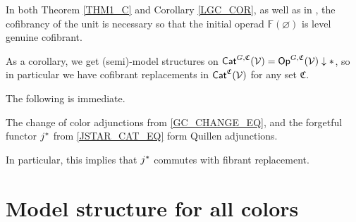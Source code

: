 \documentclass[a4paper,10pt
,draft
]{article}%
\renewcommand{\1}{\eta}%
\begin{document}
In both Theorem \ref{THM1_C} and Corollary \ref{LGC_COR}, as well as in \cite{BP_geo},
the cofibrancy of the unit is necessary so that the initial operad $\mathbb F(\varnothing)$ is level genuine cofibrant.

\begin{remark}
      \label{CATV_MC_REM}
      As a corollary, we get (semi)-model structures on $\Cat^{G, \mathfrak C}(\V) = \Op^{G, \mathfrak C}(\V) \downarrow \**$,
      so in particular we have cofibrant replacements in $\mathsf{Cat}^{\mathfrak C}(\mathcal V)$ for any set $\mathfrak C$.
\end{remark}










The following is immediate.
\begin{corollary}
      \label{COLOR_CHANGE_Q_COR}
      The change of color adjunctions from \eqref{GC_CHANGE_EQ},
      and the forgetful functor $j^{\**}$ from \eqref{JSTAR_CAT_EQ}
      form Quillen adjunctions.
\end{corollary}

\begin{remark}
      In particular, this implies that $j^{\**}$ commutes with fibrant replacement.
\end{remark}






















\newpage

\section{Model structure for all colors}
\label{MS_SEC}
\renewcommand{\C}{\mathfrak C}

\end{document}
